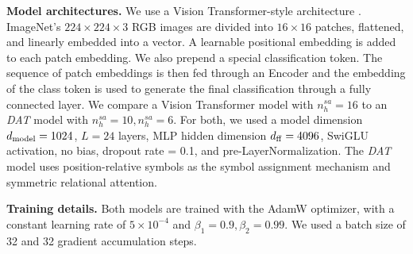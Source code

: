 \textbf{Model architectures.} We use a Vision Transformer-style architecture \citep{dosovitskiyImageWorth16x162020}. ImageNet's $224 \times 224 \times 3$ RGB images are divided into $16 \times 16$ patches, flattened, and linearly embedded into a vector. A learnable positional embedding is added to each patch embedding. We also prepend a special classification token. The sequence of patch embeddings is then fed through an Encoder and the embedding of the class token is used to generate the final classification through a fully connected layer. We compare a Vision Transformer model with $n_h^{sa} = 16$ to an \textit{DAT} model with $n_h^{sa} = 10, n_h^{sa} = 6$. For both, we used a model dimension $d_{\mathrm{model}} = 1024$, $L = 24$ layers, MLP hidden dimension $d_{\mathrm{ff}} = 4096$, SwiGLU activation, no bias, dropout rate = 0.1, and pre-LayerNormalization. The \textit{DAT} model uses position-relative symbols as the symbol assignment mechanism and symmetric relational attention.

\textbf{Training details.} Both models are trained with the AdamW optimizer, with a constant learning rate of $5 \times 10^{-4}$ and $\beta_1 = 0.9, \beta_2 = 0.99$. We used a batch size of 32 and 32 gradient accumulation steps.

